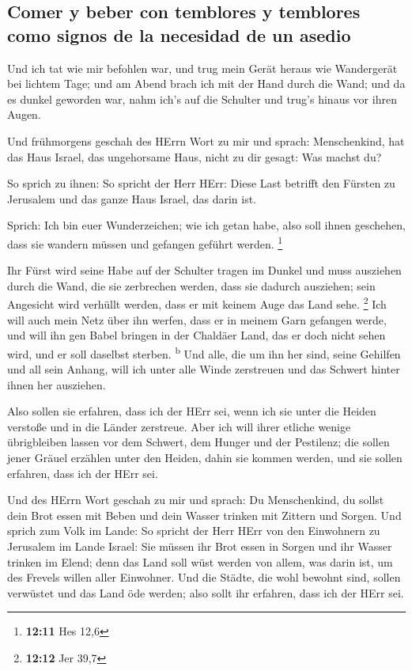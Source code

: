 \hypertarget{comer-y-beber-con-temblores-y-temblores-como-signos-de-la-necesidad-de-un-asedio}{%
\subsection{Comer y beber con temblores y temblores como signos de la
necesidad de un
asedio}\label{comer-y-beber-con-temblores-y-temblores-como-signos-de-la-necesidad-de-un-asedio}}

 Und ich tat wie mir befohlen war, und trug mein Gerät
heraus wie Wandergerät bei lichtem Tage; und am Abend brach ich mit der
Hand durch die Wand; und da es dunkel geworden war, nahm ich's auf die
Schulter und trug's hinaus vor ihren Augen.

 Und frühmorgens geschah des HErrn Wort zu mir und sprach:
 Menschenkind, hat das Haus Israel, das ungehorsame Haus,
nicht zu dir gesagt: Was machst du?

 So sprich zu ihnen: So spricht der Herr HErr: Diese Last
betrifft den Fürsten zu Jerusalem und das ganze Haus Israel, das darin
ist.

 Sprich: Ich bin euer Wunderzeichen; wie ich getan habe,
also soll ihnen geschehen, dass sie wandern müssen und gefangen geführt
werden. \footnote{\textbf{12:11} Hes 12,6}

 Ihr Fürst wird seine Habe auf der Schulter tragen im
Dunkel und muss ausziehen durch die Wand, die sie zerbrechen werden,
dass sie dadurch ausziehen; sein Angesicht wird verhüllt werden, dass er
mit keinem Auge das Land sehe. \footnote{\textbf{12:12} Jer 39,7}
 Ich will auch mein Netz über ihn werfen, dass er in
meinem Garn gefangen werde, und will ihn gen Babel bringen in der
Chaldäer Land, das er doch nicht sehen wird, und er soll daselbst
sterben. \textsuperscript{b}  Und alle, die um ihn her
sind, seine Gehilfen und all sein Anhang, will ich unter alle Winde
zerstreuen und das Schwert hinter ihnen her ausziehen.

 Also sollen sie erfahren, dass ich der HErr sei, wenn
ich sie unter die Heiden verstoße und in die Länder zerstreue.
 Aber ich will ihrer etliche wenige übrigbleiben lassen
vor dem Schwert, dem Hunger und der Pestilenz; die sollen jener Gräuel
erzählen unter den Heiden, dahin sie kommen werden, und sie sollen
erfahren, dass ich der HErr sei.

 Und des HErrn Wort geschah zu mir und sprach:
 Du Menschenkind, du sollst dein Brot essen mit Beben und
dein Wasser trinken mit Zittern und Sorgen.  Und sprich
zum Volk im Lande: So spricht der Herr HErr von den Einwohnern zu
Jerusalem im Lande Israel: Sie müssen ihr Brot essen in Sorgen und ihr
Wasser trinken im Elend; denn das Land soll wüst werden von allem, was
darin ist, um des Frevels willen aller Einwohner.  Und
die Städte, die wohl bewohnt sind, sollen verwüstet und das Land öde
werden; also sollt ihr erfahren, dass ich der HErr sei.

